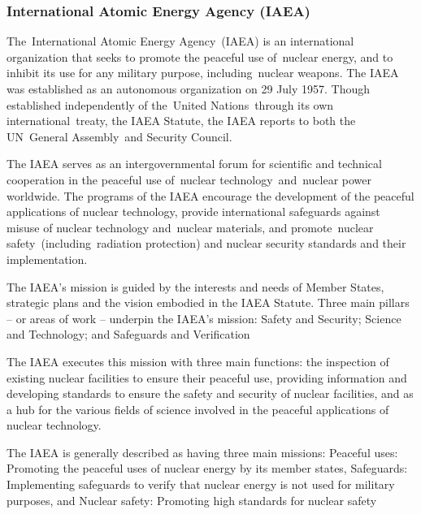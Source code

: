 \documentclass[a4paper]{article}
\begin{document}
\subsubsection{International Atomic Energy Agency (IAEA)}
The International Atomic Energy Agency (IAEA) is an international organization 
that seeks to promote the peaceful use of nuclear energy, and to inhibit its use 
for any military purpose, including nuclear weapons. The IAEA was established as 
an autonomous organization on 29 July 1957. Though established independently of 
the United Nations through its own international treaty, the IAEA Statute, the 
IAEA reports to both the UN General Assembly and Security Council.

The IAEA serves as an intergovernmental forum for scientific and technical 
cooperation in the peaceful use of nuclear technology and nuclear power worldwide. 
The programs of the IAEA encourage the development of the peaceful applications of 
nuclear technology, provide international safeguards against misuse of nuclear 
technology and nuclear materials, and promote nuclear safety (including radiation 
protection) and nuclear security standards and their implementation.

The IAEA's mission is guided by the interests and needs of Member States, strategic 
plans and the vision embodied in the IAEA Statute. Three main pillars -- or areas of 
work -- underpin the IAEA's mission: Safety and Security; Science and Technology; 
and Safeguards and Verification

The IAEA executes this mission with three main functions: the inspection of existing 
nuclear facilities to ensure their peaceful use, providing information and developing 
standards to ensure the safety and security of nuclear facilities, and as a hub for 
the various fields of science involved in the peaceful applications of nuclear technology.

The IAEA is generally described as having three main missions:
Peaceful uses: Promoting the peaceful uses of nuclear energy by its member states,
Safeguards: Implementing safeguards to verify that nuclear energy is not used for military purposes, and
Nuclear safety: Promoting high standards for nuclear safety
\end{document}
